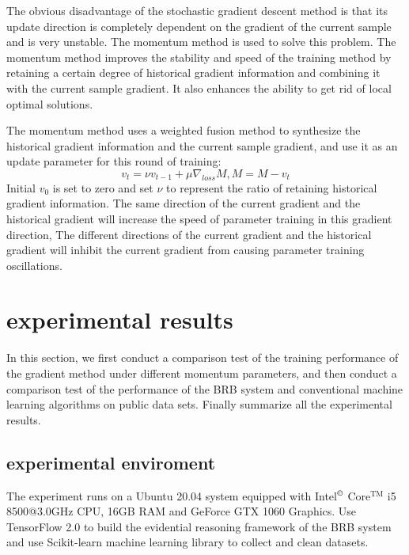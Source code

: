 \documentclass{ieeeaccess}
\begin{document}
The obvious disadvantage of the stochastic gradient descent method is that its update direction is completely dependent on the gradient of the current sample and is very unstable. The momentum method is used to solve this problem.
The momentum method improves the stability and speed of the training method by retaining a certain degree of historical gradient information and combining it with the current sample gradient.
It also enhances the ability to get rid of local optimal solutions.

The momentum method uses a weighted fusion method to synthesize the historical gradient information and the current sample gradient,
and use it as an update parameter for this round of training:
$$v_t=\nu v_{t-1}+\mu\nabla_{loss}M,M=M-v_t$$
Initial $v_0$ is set to zero and set $\nu$ to represent the ratio of retaining historical gradient information.
The same direction of the current gradient and the historical gradient will increase the speed of parameter training in this gradient direction,
The different directions of the current gradient and the historical gradient will inhibit the current gradient from causing parameter training oscillations.

\section{experimental results}
In this section,
we first conduct a comparison test of the training performance of the gradient method under different momentum parameters,
and then conduct a comparison test of the performance of the BRB system and conventional machine learning algorithms on public data sets.
Finally summarize all the experimental results.

\subsection{experimental enviroment}
The experiment runs on a Ubuntu 20.04 system equipped with Intel$^\copyright$ Core$^\text{TM}$ i5 8500@3.0GHz CPU, 16GB RAM and GeForce GTX 1060 Graphics.
Use TensorFlow 2.0 to build the evidential reasoning framework of the BRB system and
use Scikit-learn machine learning library to collect and clean datasets.
\end{document}
